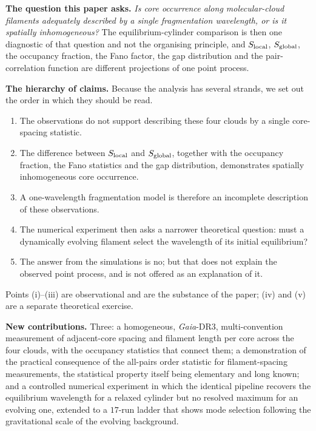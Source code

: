 \documentclass[usenatbib,twoside,twocolumn]{mnras}
\begin{document}
\smallskip\noindent\textbf{The question this paper asks.} \emph{Is core occurrence along molecular-cloud filaments adequately described by a single fragmentation wavelength, or is it spatially inhomogeneous?} The equilibrium-cylinder comparison is then one diagnostic of that question and not the organising principle, and $S_{\rm local}$, $S_{\rm global}$, the occupancy fraction, the Fano factor, the gap distribution and the pair-correlation function are different projections of one point process.

\smallskip\noindent\textbf{The hierarchy of claims.} Because the analysis has several strands, we set out the order in which they should be read.
\begin{enumerate}\setlength{\itemsep}{1pt}
\item The observations do not support describing these four clouds by a single core-spacing statistic.
\item The difference between $S_{\rm local}$ and $S_{\rm global}$, together with the occupancy fraction, the Fano statistics and the gap distribution, demonstrates spatially inhomogeneous core occurrence.
\item A one-wavelength fragmentation model is therefore an incomplete description of these observations.
\item The numerical experiment then asks a narrower theoretical question: must a dynamically evolving filament select the wavelength of its initial equilibrium?
\item The answer from the simulations is no; but that does not explain the observed point process, and is not offered as an explanation of it.
\end{enumerate}
Points (i)--(iii) are observational and are the substance of the paper; (iv) and (v) are a separate theoretical exercise.

\smallskip\noindent\textbf{New contributions.} Three: a homogeneous, \textit{Gaia}-DR3, multi-convention measurement of adjacent-core spacing and filament length per core across the four clouds, with the occupancy statistics that connect them; a demonstration of the practical consequence of the all-pairs order statistic for filament-spacing measurements, the statistical property itself being elementary and long known; and a controlled numerical experiment in which the identical pipeline recovers the equilibrium wavelength for a relaxed cylinder but no resolved maximum for an evolving one, extended to a $17$-run ladder that shows mode selection following the gravitational scale of the evolving background.
\end{document}
